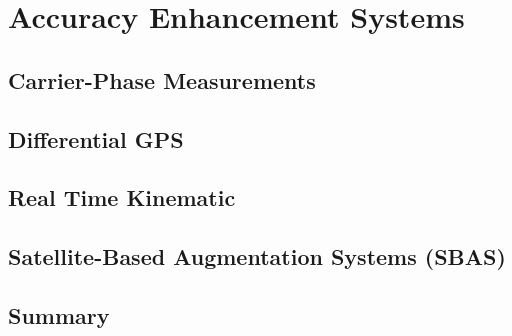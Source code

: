 \chapter{Accuracy Enhancement Systems}


\section{Carrier-Phase Measurements}

\section{Differential GPS}

\section{Real Time Kinematic}

\section{Satellite-Based Augmentation Systems (SBAS)}

\section{Summary}